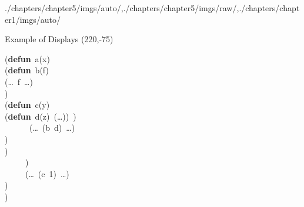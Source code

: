 \begin{graphicspathcontext}{{./chapters/chapter5/imgs/auto/},{./chapters/chapter5/imgs/raw/},{./chapters/chapter1/imgs/auto/}}
\begin{bibunit}[apalike]
\begin{frame}[fragile]{Example of Displays}
	\putat(220,-75){\parbox{.4\linewidth}{\normalcolor\mdseries
			\begin{tiny}
				{{\def\dash{\raise2.1pt\hbox{\rule{1pt}{0.3pt}}\hspace{1pt}}\begin{tabbing}
							({\textbf{defun}}\ a(x)\\
							\makebox[16pt][l]{}({\textbf{defun}}\ b(f)\\
							\makebox[16pt][l]{}\makebox[16pt][l]{}\makebox[16pt][l]{}(\dots\ f\ \dots)\\
							\makebox[16pt][l]{}\makebox[16pt][l]{})\\
							\makebox[16pt][l]{}\makebox[16pt][l]{}({\textbf{defun}}\ c(y)\\
							\makebox[16pt][l]{}\makebox[16pt][l]{}\makebox[16pt][l]{}({\textbf{defun}}\ d(z)\ (\dots))\ )\\
							\makebox[16pt][l]{}\makebox[16pt][l]{}\makebox[16pt][l]{}\ \ \ \ \ \ (\dots\ (b\ d)\ \dots)\\
							\makebox[16pt][l]{}\makebox[16pt][l]{}\makebox[16pt][l]{})\\
							\makebox[16pt][l]{}\makebox[16pt][l]{})\\
							\makebox[16pt][l]{}\ \ \ \ \ )\\
							\makebox[16pt][l]{}\ \ \ \ \ (\dots\ (c\ 1)\ \dots)\\
							\makebox[16pt][l]{})\\
							)
				\end{tabbing}}}
			\end{tiny}
	}}
	

\end{frame}
\end{bibunit}
\end{graphicspathcontext}
